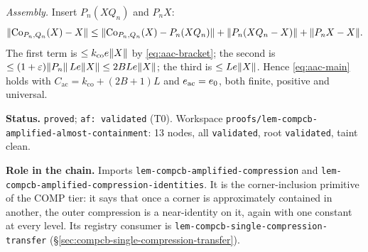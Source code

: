 \emph{Assembly.} Insert $P_n(XQ_n)$ and $P_nX$:
\[
  \lVert \mathrm{Co}_{P_n,Q_n}(X)-X\rVert
  \le\lVert \mathrm{Co}_{P_n,Q_n}(X)-P_n(XQ_n)\rVert+\lVert P_n(XQ_n-X)\rVert+\lVert P_nX-X\rVert.
\]
The first term is $\le k_{\mathrm{co}}e\lVert X\rVert$ by \eqref{eq:aac-bracket}; the second
is $\le(1+\varepsilon)\lVert P_n\rVert\,Le\lVert X\rVert\le2BLe\lVert X\rVert$; the third is
$\le Le\lVert X\rVert$. Hence \eqref{eq:aac-main} holds with
$C_{\mathrm{ac}}=k_{\mathrm{co}}+(2B+1)L$ and $e_{\mathrm{ac}}=e_0$, both finite,
positive and universal.

\medskip
\noindent\textbf{Status.} \texttt{proved}; \texttt{af: validated} (T0). Workspace
\texttt{proofs/lem-compcb-amplified-almost-containment}: 13 nodes, all
\texttt{validated}, root \texttt{validated}, taint clean.

\noindent\textbf{Role in the chain.} Imports
\texttt{lem-compcb-amplified-compression} and
\texttt{lem-compcb-amplified-compression-identities}. It is the corner-inclusion
primitive of the COMP tier: it says that once a corner is approximately contained in
another, the outer compression is a near-identity on it, again with one constant at every
level. Its registry consumer is
\texttt{lem-compcb-single-compression-transfer}
(\S\ref{sec:compcb-single-compression-transfer}).
